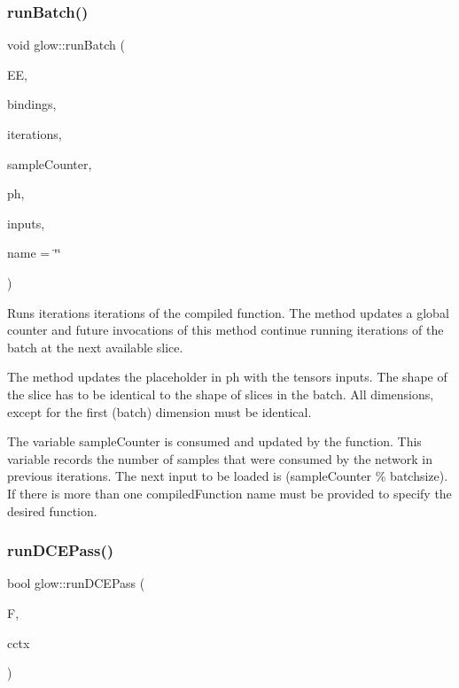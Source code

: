 \subsubsection{\texorpdfstring{run\+Batch()}{runBatch()}}
{\footnotesize\ttfamily void glow\+::run\+Batch (\begin{DoxyParamCaption}\item[{\hyperlink{classglow_1_1_execution_engine}{Execution\+Engine} \&}]{EE,  }\item[{\hyperlink{classglow_1_1_placeholder_bindings}{Placeholder\+Bindings} \&}]{bindings,  }\item[{size\+\_\+t}]{iterations,  }\item[{size\+\_\+t \&}]{sample\+Counter,  }\item[{llvm\+::\+Array\+Ref$<$ \hyperlink{classglow_1_1_placeholder}{Placeholder} $\ast$$>$}]{ph,  }\item[{llvm\+::\+Array\+Ref$<$ \hyperlink{classglow_1_1_tensor}{Tensor} $\ast$$>$}]{inputs,  }\item[{llvm\+::\+String\+Ref}]{name = {\ttfamily \char`\"{}\char`\"{}} }\end{DoxyParamCaption})}

Runs {\ttfamily iterations} iterations of the compiled function. The method updates a global counter and future invocations of this method continue running iterations of the batch at the next available slice.

The method updates the placeholder in {\ttfamily ph} with the tensors {\ttfamily inputs}. The shape of the slice has to be identical to the shape of slices in the batch. All dimensions, except for the first (batch) dimension must be identical.

The variable {\ttfamily sample\+Counter} is consumed and updated by the function. This variable records the number of samples that were consumed by the network in previous iterations. The next input to be loaded is (sample\+Counter \% batchsize). If there is more than one compiled\+Function {\ttfamily name} must be provided to specify the desired function. \mbox{\label{namespaceglow_a70f636287069c1f7f97e401c440ae580}} 
\subsubsection{\texorpdfstring{run\+D\+C\+E\+Pass()}{runDCEPass()}}
{\footnotesize\ttfamily bool glow\+::run\+D\+C\+E\+Pass (\begin{DoxyParamCaption}\item[{\hyperlink{classglow_1_1_function}{Function} $\ast$}]{F,  }\item[{\hyperlink{structglow_1_1_compilation_context}{Compilation\+Context} \&}]{cctx }\end{DoxyParamCaption})}



